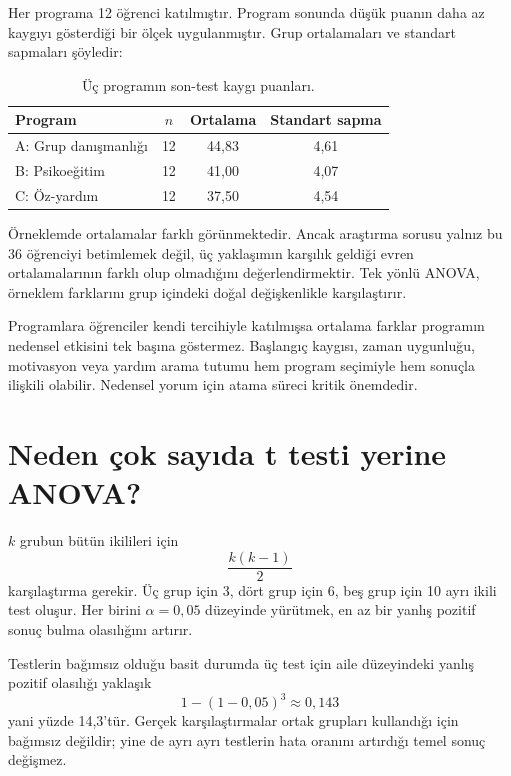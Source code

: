 Her programa 12 öğrenci katılmıştır. Program sonunda düşük puanın daha az
kaygıyı gösterdiği bir ölçek uygulanmıştır. Grup ortalamaları ve standart
sapmaları şöyledir:

\begin{table}[htbp]
\centering
\caption{Üç programın son-test kaygı puanları.}
\begin{tabular}{@{}lccc@{}}
\toprule
Program & $n$ & Ortalama & Standart sapma \\
\midrule
A: Grup danışmanlığı & 12 & 44,83 & 4,61 \\
B: Psikoeğitim & 12 & 41,00 & 4,07 \\
C: Öz-yardım & 12 & 37,50 & 4,54 \\
\bottomrule
\end{tabular}
\end{table}

Örneklemde ortalamalar farklı görünmektedir. Ancak araştırma sorusu yalnız bu
36 öğrenciyi betimlemek değil, üç yaklaşımın karşılık geldiği evren
ortalamalarının farklı olup olmadığını değerlendirmektir. Tek yönlü ANOVA,
örneklem farklarını grup içindeki doğal değişkenlikle karşılaştırır.

\begin{researchbox}
Programlara öğrenciler kendi tercihiyle katılmışsa ortalama farklar programın
nedensel etkisini tek başına göstermez. Başlangıç kaygısı, zaman uygunluğu,
motivasyon veya yardım arama tutumu hem program seçimiyle hem sonuçla ilişkili
olabilir. Nedensel yorum için atama süreci kritik önemdedir.
\end{researchbox}

\section{Neden çok sayıda t testi yerine ANOVA?}

$k$ grubun bütün ikilileri için
\[
\frac{k(k-1)}{2}
\]
karşılaştırma gerekir. Üç grup için 3, dört grup için 6, beş grup için 10 ayrı
ikili test oluşur. Her birini $\alpha=0{,}05$ düzeyinde yürütmek, en az bir
yanlış pozitif sonuç bulma olasılığını artırır.

Testlerin bağımsız olduğu basit durumda üç test için aile düzeyindeki yanlış
pozitif olasılığı yaklaşık
\[
1-(1-0{,}05)^3\approx0{,}143
\]
yani yüzde 14,3'tür. Gerçek karşılaştırmalar ortak grupları kullandığı için
bağımsız değildir; yine de ayrı ayrı testlerin hata oranını artırdığı temel
sonuç değişmez.

